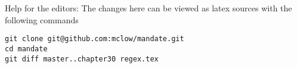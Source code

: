 
\vfill
Help for the editors: The changes here can be viewed as latex sources with the following commands
\begin{verbatim}
git clone git@github.com:mclow/mandate.git
cd mandate
git diff master..chapter30 regex.tex
\end{verbatim}
